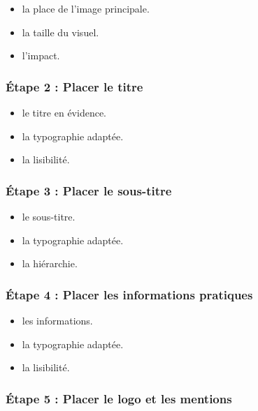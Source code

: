 \begin{itemize}
    \item {} la place de l'image principale.
    \item {} la taille du visuel.
    \item {} l'impact.
\end{itemize}

\subsubsection{Étape 2 : Placer le titre}

\begin{itemize}
    \item {} le titre en évidence.
    \item {} la typographie adaptée.
    \item {} la lisibilité.
\end{itemize}

\subsubsection{Étape 3 : Placer le sous-titre}

\begin{itemize}
    \item {} le sous-titre.
    \item {} la typographie adaptée.
    \item {} la hiérarchie.
\end{itemize}

\subsubsection{Étape 4 : Placer les informations pratiques}

\begin{itemize}
    \item {} les informations.
    \item {} la typographie adaptée.
    \item {} la lisibilité.
\end{itemize}

\subsubsection{Étape 5 : Placer le logo et les mentions}

